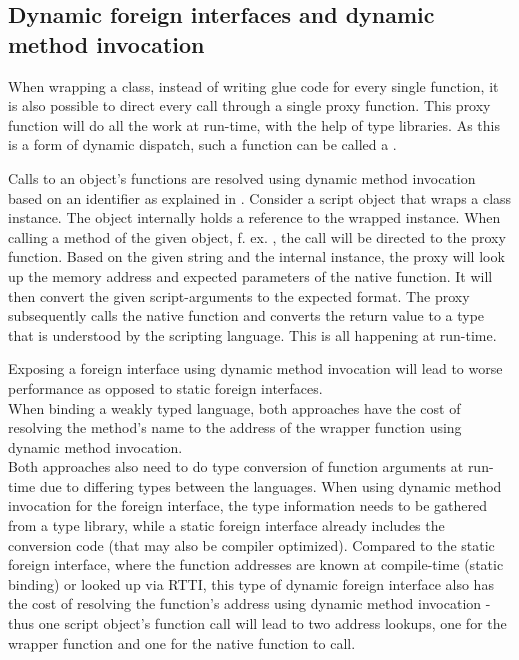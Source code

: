 
\subsection{Dynamic foreign interfaces and dynamic method invocation}
\label{sec:DynamicForeignInterfaces}

When wrapping a class, instead of writing glue code for every single function, it is also possible to direct every call through a single proxy function. This proxy function will do all the work at run-time, with the help of type libraries. As this is a form of dynamic dispatch, such a function can be called a .

Calls to an object's functions are resolved using dynamic method invocation based on an identifier as explained in . Consider a script object that wraps a class instance. The object internally holds a reference to the wrapped instance. When calling a method of the given object, f. ex. , the call will be directed to the proxy function. Based on the given string  and the internal instance, the proxy will look up the memory address and expected parameters of the native function. It will then convert the given script-arguments to the expected format. The proxy subsequently calls the native function and converts the return value to a type that is understood by the scripting language. This is all happening at run-time.

Exposing a foreign interface using dynamic method invocation will lead to worse performance as opposed to static foreign interfaces.\\
When binding a weakly typed language, both approaches have the cost of resolving the method's name to the address of the wrapper function using dynamic method invocation.\\
Both approaches also need to do type conversion of function arguments at run-time due to differing types between the languages. When using dynamic method invocation for the foreign interface, the type information needs to be gathered from a type library, while a static foreign interface already includes the conversion code (that may also be compiler optimized). Compared to the static foreign interface, where the function addresses are known at compile-time (static binding) or looked up via RTTI, this type of dynamic foreign interface also has the cost of resolving the function's address using dynamic method invocation - thus one script object's function call will lead to two address lookups, one for the wrapper function and one for the native function to call.

